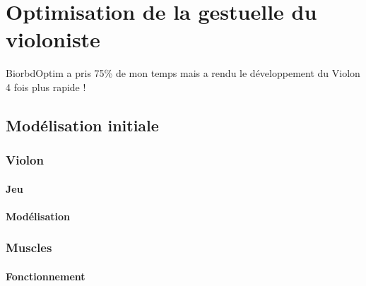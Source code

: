 \part{Optimisation de la gestuelle du violoniste}

BiorbdOptim a pris 75\% de mon temps mais a rendu le développement du Violon 4 fois plus rapide !


% 
%     
% 
%     


    \chapter{Modélisation initiale}
        \section{Violon}
            \subsection{Jeu}
            \subsection{Modélisation}
            

        \section{Muscles}
            \subsection{Fonctionnement}
